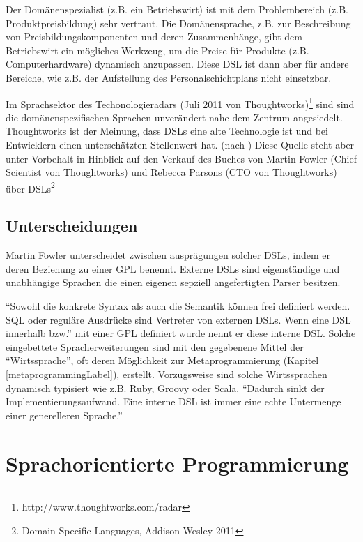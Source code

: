 \documentclass[11pt,english,ngerman, headsepline]{scrreprt}
\begin{document}
Der Domänenspezialist (z.B. ein Betriebswirt) ist mit dem Problembereich (z.B.
Produktpreisbildung) sehr vertraut. Die Domänensprache, z.B. zur Beschreibung
von Preisbildungskomponenten und deren Zusammenhänge, gibt dem Betriebswirt ein
mögliches Werkzeug, um die Preise für Produkte (z.B. Computerhardware) dynamisch
anzupassen. Diese DSL ist dann aber für andere Bereiche, wie z.B.
der Aufstellung des Personalschichtplans nicht einsetzbar.

Im Sprachsektor des Techonologieradars (Juli 2011 von
Thoughtworks)\footnote[1]{http://www.thoughtworks.com/radar}
sind sind die domänenspezifischen Sprachen unverändert nahe dem Zentrum
angesiedelt. Thoughtworks ist der Meinung, dass DSLs eine alte Technologie ist
und bei Entwicklern einen unterschätzten Stellenwert
hat. (nach \cite{thoughtworks-tr}) Diese Quelle steht aber unter Vorbehalt in
Hinblick auf den Verkauf des Buches von Martin Fowler (Chief Scientist von
Thoughtworks) und Rebecca Parsons (CTO von Thoughtworks) über DSLs\footnote[2]{Domain Specific
Languages, Addison Wesley 2011} 

\subsection{Unterscheidungen}

Martin Fowler unterscheidet zwischen ausprägungen solcher DSLs, indem er deren
Beziehung zu einer GPL benennt. Externe DSLs sind eigenständige und unabhängige
Sprachen die einen eigenen sepziell angefertigten Parser besitzen. 

``Sowohl die konkrete Syntax als auch die Semantik können frei definiert
werden. SQL oder reguläre Ausdrücke sind Vertreter von externen DSLs. Wenn eine
DSL innerhalb bzw.'' \cite{wikidsl}
mit einer GPL definiert wurde nennt er diese interne DSL. Solche eingebettete Spracherweiterungen sind mit den
gegebenene Mittel der ``Wirtssprache'', oft deren Möglichkeit zur
Metaprogrammierung (Kapitel \ref{metaprogrammingLabel}), erstellt.
Vorzugsweise sind solche Wirtssprachen dynamisch typisiert wie z.B. Ruby, Groovy
oder Scala. 
``Dadurch sinkt der Implementierungsaufwand. Eine interne DSL ist immer eine echte
Untermenge einer generelleren Sprache.'' \cite{wikidsl}

 


\section{Sprachorientierte Programmierung}
\end{document}

